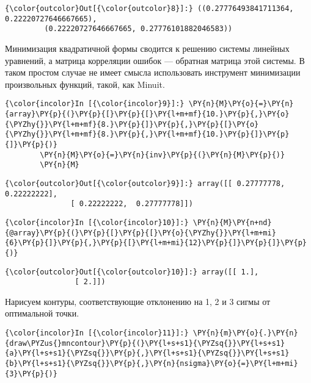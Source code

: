 \begin{Verbatim}[commandchars=\\\{\}]
{\color{outcolor}Out[{\color{outcolor}8}]:} ((0.27776493841711364, 0.22220727646667665),
         (0.22220727646667665, 0.27776101882046583))
\end{Verbatim}
            
    Минимизация квадратичной формы сводится к решению системы линейных
уравнений, а матрица корреляции ошибок --- обратная матрица этой системы.
В таком простом случае не имеет смысла использовать инструмент
минимизации произвольных функций, такой, как Minuit.

    \begin{Verbatim}[commandchars=\\\{\}]
{\color{incolor}In [{\color{incolor}9}]:} \PY{n}{M}\PY{o}{=}\PY{n}{array}\PY{p}{(}\PY{p}{[}\PY{p}{[}\PY{l+m+mf}{10.}\PY{p}{,}\PY{o}{\PYZhy{}}\PY{l+m+mf}{8.}\PY{p}{]}\PY{p}{,}\PY{p}{[}\PY{o}{\PYZhy{}}\PY{l+m+mf}{8.}\PY{p}{,}\PY{l+m+mf}{10.}\PY{p}{]}\PY{p}{]}\PY{p}{)}
        \PY{n}{M}\PY{o}{=}\PY{n}{inv}\PY{p}{(}\PY{n}{M}\PY{p}{)}
        \PY{n}{M}
\end{Verbatim}


\begin{Verbatim}[commandchars=\\\{\}]
{\color{outcolor}Out[{\color{outcolor}9}]:} array([[ 0.27777778,  0.22222222],
               [ 0.22222222,  0.27777778]])
\end{Verbatim}
            
    \begin{Verbatim}[commandchars=\\\{\}]
{\color{incolor}In [{\color{incolor}10}]:} \PY{n}{M}\PY{n+nd}{@array}\PY{p}{(}\PY{p}{[}\PY{p}{[}\PY{o}{\PYZhy{}}\PY{l+m+mi}{6}\PY{p}{]}\PY{p}{,}\PY{p}{[}\PY{l+m+mi}{12}\PY{p}{]}\PY{p}{]}\PY{p}{)}
\end{Verbatim}


\begin{Verbatim}[commandchars=\\\{\}]
{\color{outcolor}Out[{\color{outcolor}10}]:} array([[ 1.],
                [ 2.]])
\end{Verbatim}
            
    Нарисуем контуры, соответствующие отклонению на 1, 2 и 3 сигмы от
оптимальной точки.

    \begin{Verbatim}[commandchars=\\\{\}]
{\color{incolor}In [{\color{incolor}11}]:} \PY{n}{m}\PY{o}{.}\PY{n}{draw\PYZus{}mncontour}\PY{p}{(}\PY{l+s+s1}{\PYZsq{}}\PY{l+s+s1}{a}\PY{l+s+s1}{\PYZsq{}}\PY{p}{,}\PY{l+s+s1}{\PYZsq{}}\PY{l+s+s1}{b}\PY{l+s+s1}{\PYZsq{}}\PY{p}{,}\PY{n}{nsigma}\PY{o}{=}\PY{l+m+mi}{3}\PY{p}{)}
\end{Verbatim}


